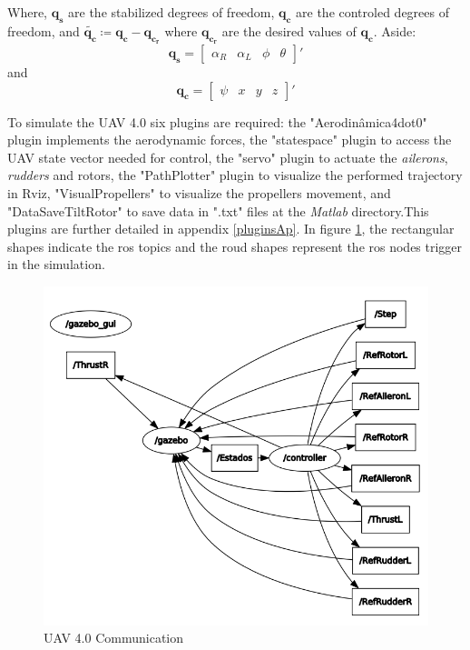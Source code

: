 Where, $\bm{q_{s}}$ are the stabilized degrees of freedom, $\bm{q_{c}}$ are the controled degrees of freedom, and $\tilde{\bm{q_{c}}} \coloneqq  \bm{q_{c}} - \bm{q_{c_{r}}}$ where $\bm{q_{c_{r}}}$ are the desired values of $\bm{q_{c}}$. Aside:
\begin{equation*}
\bm{q_{s}} = \begin{bmatrix}
\alpha_R & \alpha_L & \phi & \theta
\end{bmatrix}'
\end{equation*}
and
\begin{equation*}
\bm{q_{c}} = \begin{bmatrix}
\psi & x & y & z
\end{bmatrix}'
\end{equation*}

To simulate the UAV 4.0 six plugins are required: the "Aerodinâmica4dot0" plugin implements the aerodynamic forces, the "statespace" plugin to access the UAV state vector needed for control, the "servo" plugin to actuate the \textit{ailerons}, \textit{rudders} and rotors, the "PathPlotter" plugin to visualize the performed trajectory in Rviz, "VisualPropellers" to visualize the propellers movement, and "DataSaveTiltRotor" to save data in ".txt" files at the \textit{Matlab} directory.This plugins are further detailed in appendix \ref{pluginsAp}. In figure \ref{v4graph}, the rectangular shapes indicate the ros topics and the roud shapes represent the ros nodes trigger in the simulation.


\begin{figure}[!ht]
	\centering
	\includegraphics[width=350pt]{figuras/v4graph.png}
	\caption{UAV 4.0 Communication}
	\label{v4graph}
\end{figure}





